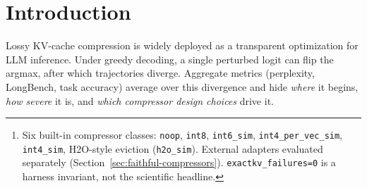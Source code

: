 \documentclass[11pt]{article}
\begin{document}
\begin{abstract}
Lossy KV-cache compression is widely deployed, but most evaluations report aggregate
quality and stop there. ExactKV is a compressor-agnostic \textbf{crash-test framework}
that measures first-divergence index, draft acceptance, unguarded lossy damage, and
\texttt{exactkv\_failure} under verifier-mediated semantics.

Across \textbf{8,132 GPU cells} on Llama-3.1-8B and Mistral-7B
(Appendix benchmark card)\footnote{Six built-in compressor classes: \texttt{noop},
\texttt{int8}, \texttt{int6\_sim}, \texttt{int4\_per\_vec\_sim}, \texttt{int4\_sim},
H2O-style eviction (\texttt{h2o\_sim}). External adapters evaluated separately
(Section~\ref{sec:faithful-compressors}). \texttt{exactkv\_failures=0} is a harness
invariant, not the scientific headline.}, four main findings (glance table below):

\begin{enumerate}
\item \textbf{Matched budgets:} Mistral 0\%, 23\%, 97\%, Llama 17\%, 26\%, 91\%
  (\texttt{int4\_sim}). H2O eviction 100\% on LongBench.
\item \textbf{Within-task length:} BFCL \texttt{int4\_sim} 9\% to 62\% (mnt 16 to 256).
\item \textbf{Three failure modes:} near-tie (int8), distribution shift (\texttt{int4\_sim}),
  attention destruction (H2O) over 1{,}103 divergent cells.
\item \textbf{Recovery:} BFCL validity \textbf{318/318} when full-KV valid; MBPP 12/12
  (Llama); LongBench overlap 100\% vs full-KV.
\end{enumerate}

\begin{sloppypar}
\noindent\texttt{int6\_sim} and \texttt{int4\_per\_vec\_sim} are GPU-validated
non-catastrophic on structured tasks (extended validation, 1{,}568 cells).
\textbf{Faithful upstream adapters} (1{,}568 appendix cells): TurboQuant is
task-conditional ($\sim$65\% LongBench); \texttt{int8} remains the only
non-catastrophic real compressor in that grid (8.3\% combined).
Drift is jointly governed by task, length, compressor class, and granularity.
Results are \textbf{not} benchmark scores, production claims, or a reproduction of
VeriCache~\citep{vericache2026}.
\end{sloppypar}
\end{abstract}

\section{Introduction}
Lossy KV-cache compression is widely deployed as a transparent optimization for
LLM inference. Under greedy decoding, a single perturbed logit can flip the
argmax, after which trajectories diverge. Aggregate metrics (perplexity,
LongBench, task accuracy) average over this divergence and hide \emph{where}
it begins, \emph{how severe} it is, and \emph{which compressor design choices}
drive it.
\end{document}
